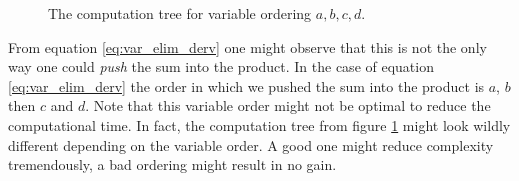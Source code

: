 \begin{figure}[h!]
\caption{The computation tree for variable ordering $a, b, c, d$.}
\label{fig:comp_tree_var_elim}
\end{figure}

\noindent
From equation \ref{eq:var_elim_derv} one might observe that this
is not the only way one could \textit{push} the sum into the product.
In the case of equation \ref{eq:var_elim_derv} the order in which
we pushed the sum into the product is $a$, $b$ then $c$ and $d$.
Note that this variable order might not be optimal to reduce the
computational time. In fact, the computation tree from figure 
\ref{fig:comp_tree_var_elim} might look wildly different depending
on the variable order. A good one might reduce complexity tremendously,
a bad ordering might result in no gain.

